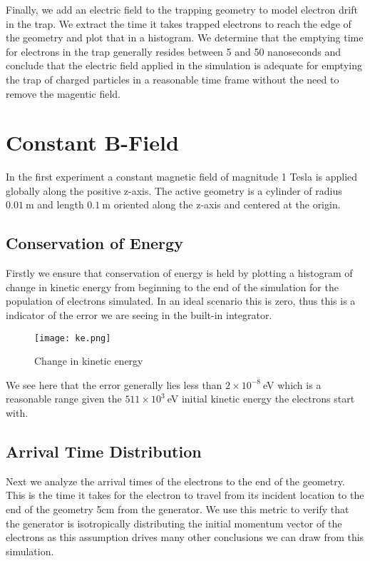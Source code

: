 \documentclass[12pt,letterpaper]{article}
\begin{document}
Finally, we add an electric field to the trapping geometry to model electron drift in the trap. We extract the time it takes trapped electrons to reach the edge of the geometry and plot that in a histogram. We determine that the emptying time for electrons in the trap generally resides between 5 and 50 nanoseconds and conclude that the electric field applied in the simulation is adequate for emptying the trap of charged particles in a reasonable time frame without the need to remove the magentic field. 

\section{Constant B-Field}

In the first experiment a constant magnetic field of magnitude 1 Tesla is applied globally along the positive z-axis. The active geometry is a cylinder of radius $0.01~$m and length $0.1~$m oriented along the z-axis and centered at the origin.

\subsection{Conservation of Energy}

Firstly we ensure that conservation of energy is held by plotting a histogram of change in kinetic energy from beginning to the end of the simulation for the population of electrons simulated. In an ideal scenario this is zero, thus this is a indicator of the error we are seeing in the built-in integrator. 

    \begin{figure}[H]
    \centering
    \texttt{[image: ke.png]}
    \caption{Change in kinetic energy}
    \end{figure}
    
We see here that the error generally lies less than $2\times10^{-8}~$eV which is a reasonable range given the $511\times10^{3}~$eV initial kinetic energy the electrons start with.

\subsection{Arrival Time Distribution}

Next we analyze the arrival times of the electrons to the end of the geometry. This is the time it takes for the electron to travel from its incident location to the end of the geometry 5cm from the generator. We use this metric to verify that the generator is isotropically distributing the initial momentum vector of the electrons as this assumption drives many other conclusions we can draw from this simulation. 
\end{document}
